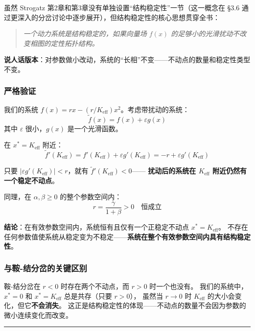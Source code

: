 \documentclass[12pt,a4paper]{article}
\begin{document}
虽然 Strogatz 第2章和第3章没有单独设置``结构稳定性''一节（这一概念在 \S3.6
通过更深入的分岔讨论中逐步展开），但结构稳定性的核心思想贯穿全书：

\begin{quote}
\small
\textit{一个动力系统是结构稳定的，如果向量场 $f(x)$ 的足够小的光滑扰动不改变相图的定性拓扑结构。}
\end{quote}

\textbf{说人话版本}：对参数做小改动，系统的``长相''不变——不动点的数量和稳定性类型不变。

\subsubsection{严格验证}
我们的系统 $f(x) = r x - (r/K_{\text{eff}}) x^2$。考虑带扰动的系统：
\begin{equation}
\tilde{f}(x) = f(x) + \varepsilon g(x)
\end{equation}
其中 $\varepsilon$ 很小，$g(x)$ 是一个光滑函数。

在 $x^* = K_{\text{eff}}$ 附近：
\begin{equation}
\tilde{f}'(K_{\text{eff}}) = f'(K_{\text{eff}}) + \varepsilon g'(K_{\text{eff}})
                           = -r + \varepsilon g'(K_{\text{eff}})
\end{equation}

只要 $|\varepsilon g'(K_{\text{eff}})| < r$，就有 $\tilde{f}'(K_{\text{eff}}) < 0$——
\textbf{扰动后的系统在 $K_{\text{eff}}$ 附近仍然有一个稳定不动点}。

同理，在 $\alpha, \beta \geq 0$ 的整个参数空间内：
\begin{equation}
r = \frac{\gamma}{1+\beta} > 0 \quad \text{恒成立}
\end{equation}

\textbf{结论}：在有效参数空间内，系统恒有且仅有一个正稳定不动点 $x^* = K_{\text{eff}}$。
不存在任何参数值使系统从稳定变为不稳定——\textbf{系统在整个有效参数空间内具有结构稳定性}。

\subsubsection{与鞍-结分岔的关键区别}
鞍-结分岔在 $r < 0$ 时存在两个不动点，而 $r > 0$ 时一个也没有。
我们的系统中，$x^* = 0$ 和 $x^* = K_{\text{eff}}$ 总是共存（只要 $r > 0$），
虽然当 $r \to 0$ 时 $K_{\text{eff}}$ 的大小会变化，但它\textbf{不会消失}。
这正是结构稳定性的体现——不动点的数量不会因为参数的微小连续变化而改变。

\vspace{12pt}
\hrule
\vspace{12pt}
\end{document}

